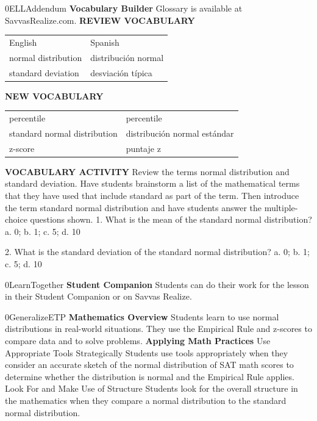 \documentclass{article}
\newenvironment{te-addendum}[2]{}{}     %
\newcommand{\answer}[1]{}               %
\newcommand{\placeholder}[2]{}          %
\newcommand{\te}[1]{}                   %
\begin{document}
\begin{te-addendum}{0}{ELLAddendum}
\textbf{Vocabulary Builder}
Glossary is available at SavvasRealize.com.
\textbf{REVIEW VOCABULARY}
\begin{tabular}{ll}
English & Spanish \\
normal distribution & distribución normal \\
standard deviation & desviación típica \\
\end{tabular}
\textbf{NEW VOCABULARY}
\begin{tabular}{ll}
percentile & percentile \\
standard normal distribution & distribución normal estándar \\
z-score & puntaje z \\
\end{tabular}
\textbf{VOCABULARY ACTIVITY}
Review the terms normal distribution and standard deviation. Have students brainstorm a list of the mathematical terms that they have used that include standard as part of the term. Then introduce the term standard normal distribution and have students answer the multiple-choice questions shown.
1. What is the mean of the standard normal distribution?
a. 0; b. 1; c. 5; d. 10
\answer{a. 0}
2. What is the standard deviation of the standard normal distribution?
a. 0; b. 1; c. 5; d. 10
\answer{b. 1}
\te{Printed Spanish percentile; likely percentil.}
\end{te-addendum}
\begin{te-addendum}{0}{LearnTogether}
\textbf{Student Companion}
Students can do their work for the lesson in their Student Companion or on Savvas Realize.
\placeholder{illustration}{Student Companion cover with multicolored abstract circular design on black; enVision Algebra 2, SAVVAS.}
\end{te-addendum}
\begin{te-addendum}{0}{GeneralizeETP}
\textbf{Mathematics Overview}
Students learn to use normal distributions in real-world situations. They use the Empirical Rule and z-scores to compare data and to solve problems.
\textbf{Applying Math Practices}
Use Appropriate Tools Strategically
Students use tools appropriately when they consider an accurate sketch of the normal distribution of SAT math scores to determine whether the distribution is normal and the Empirical Rule applies.
Look For and Make Use of Structure
Students look for the overall structure in the mathematics when they compare a normal distribution to the standard normal distribution.
\end{te-addendum}
\end{document}
